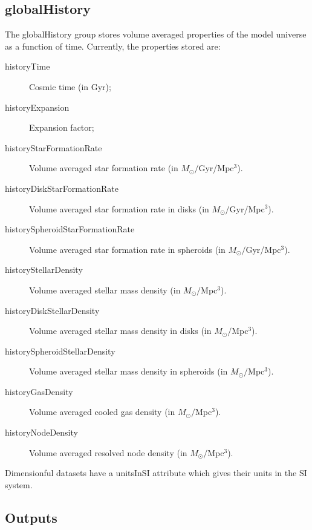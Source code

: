 \subsection{globalHistory}\label{sec:globalHistory}

The {\normalfont \ttfamily globalHistory} group stores volume averaged properties of the model universe as a function of time. Currently, the properties stored are:
\begin{description}
 \item[{\normalfont \ttfamily historyTime}] Cosmic time (in Gyr);
 \item[{\normalfont \ttfamily historyExpansion}] Expansion factor;
 \item[{\normalfont \ttfamily historyStarFormationRate}] Volume averaged star formation rate (in $M_\odot/$Gyr/Mpc$^3$).
 \item[{\normalfont \ttfamily historyDiskStarFormationRate}] Volume averaged star formation rate in disks (in $M_\odot/$Gyr/Mpc$^3$).
 \item[{\normalfont \ttfamily historySpheroidStarFormationRate}] Volume averaged star formation rate in spheroids (in $M_\odot/$Gyr/Mpc$^3$).
 \item[{\normalfont \ttfamily historyStellarDensity}] Volume averaged stellar mass density (in $M_\odot/$Mpc$^3$).
 \item[{\normalfont \ttfamily historyDiskStellarDensity}] Volume averaged stellar mass density in disks (in $M_\odot/$Mpc$^3$).
 \item[{\normalfont \ttfamily historySpheroidStellarDensity}] Volume averaged stellar mass density in spheroids (in $M_\odot/$Mpc$^3$).
 \item[{\normalfont \ttfamily historyGasDensity}] Volume averaged cooled gas density (in $M_\odot/$Mpc$^3$).
 \item[{\normalfont \ttfamily historyNodeDensity}] Volume averaged resolved node density (in $M_\odot/$Mpc$^3$).
\end{description}
Dimensionful datasets have a {\normalfont \ttfamily unitsInSI} attribute which gives their units in the SI system.

\subsection{Outputs}

